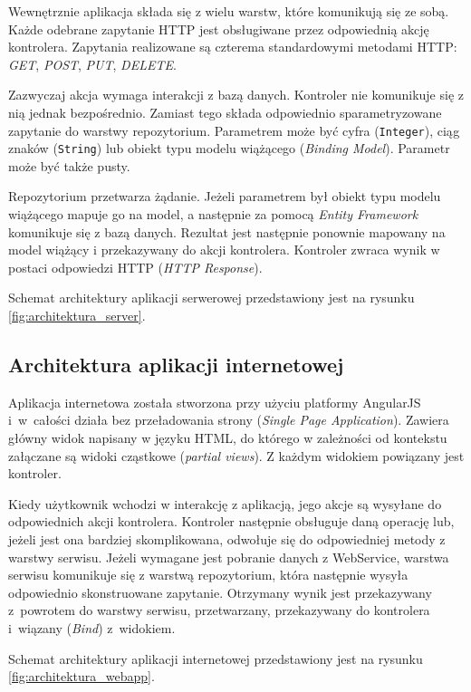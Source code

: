 \documentclass[a4paper]{book}
\begin{document}
			Wewnętrznie aplikacja składa się z wielu warstw, które komunikują się ze sobą. Każde odebrane zapytanie HTTP jest obsługiwane przez odpowiednią akcję kontrolera. Zapytania realizowane są czterema standardowymi metodami HTTP: \emph{GET}, \emph{POST}, \emph{PUT}, \emph{DELETE}.
			
			Zazwyczaj akcja wymaga interakcji z bazą danych. Kontroler nie komunikuje się z nią jednak bezpośrednio. Zamiast tego składa odpowiednio sparametryzowane zapytanie do warstwy repozytorium. Parametrem może być cyfra (\texttt{Integer}), ciąg znaków (\texttt{String}) lub obiekt typu modelu wiążącego (\emph{Binding Model}). Parametr może być także pusty. 
			
			Repozytorium przetwarza żądanie. Jeżeli parametrem był obiekt typu modelu wiążącego mapuje go na model, a następnie za pomocą \emph{Entity Framework} komunikuje się z bazą danych. Rezultat jest następnie ponownie mapowany na model wiążący i przekazywany do akcji kontrolera. Kontroler zwraca wynik w postaci odpowiedzi HTTP (\emph{HTTP Response}).
			
			Schemat architektury aplikacji serwerowej przedstawiony jest na rysunku \ref{fig:architektura_server}. 			
			
			\subsection{Architektura aplikacji internetowej}		
			
			

			Aplikacja internetowa została stworzona przy użyciu platformy AngularJS i~w~całości działa bez przeładowania strony (\emph{Single Page Application}). Zawiera główny widok napisany w języku HTML, do którego w zależności od kontekstu załączane są widoki cząstkowe (\emph{partial views}). Z każdym widokiem powiązany jest kontroler. 
			
			Kiedy użytkownik wchodzi w interakcję z aplikacją, jego akcje są wysyłane do odpowiednich akcji kontrolera. Kontroler następnie obsługuje daną operację lub, jeżeli jest ona bardziej skomplikowana, odwołuje się do odpowiedniej metody z warstwy serwisu. Jeżeli wymagane jest pobranie danych z WebService, warstwa serwisu komunikuje się z warstwą repozytorium, która następnie wysyła odpowiednio skonstruowane zapytanie. Otrzymany wynik jest przekazywany z~powrotem do warstwy serwisu, przetwarzany, przekazywany do kontrolera i~wiązany (\emph{Bind}) z~widokiem.								

			Schemat architektury aplikacji internetowej przedstawiony jest na rysunku \ref{fig:architektura_webapp}.	
			
\end{document}
